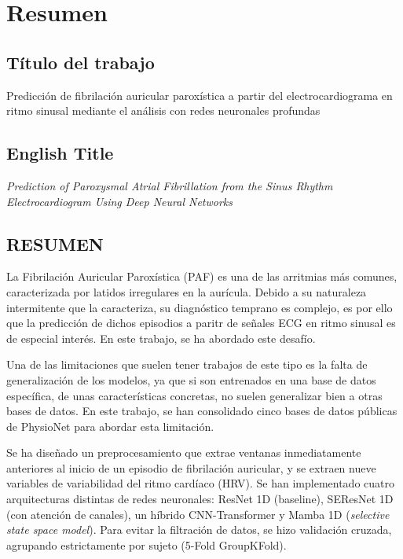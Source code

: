 
\chapter*{Resumen}

\section*{Título del trabajo}
Predicción de fibrilación auricular paroxística a partir del electrocardiograma en ritmo
sinusal mediante el análisis con redes neuronales profundas

\section*{English Title}
{\itshape Prediction of Paroxysmal Atrial Fibrillation from the Sinus Rhythm
Electrocardiogram Using Deep Neural Networks}

\section*{RESUMEN}

La Fibrilación Auricular Paroxística (PAF) es una de las arritmias más comunes, caracterizada por latidos irregulares en la aurícula.
Debido a su naturaleza intermitente que la caracteriza, su diagnóstico temprano es complejo, es por ello que la predicción de dichos 
episodios a paritr de señales ECG en ritmo sinusal es de especial interés. En este trabajo, se ha abordado este desafío.

Una de las limitaciones que suelen tener trabajos de este tipo es la falta de generalización de los modelos, ya que si son entrenados
en una base de datos específica, de unas características concretas, no suelen generalizar bien a otras bases de datos. 
En este trabajo, se han consolidado cinco bases de datos públicas de PhysioNet para abordar esta limitación. 

Se ha diseñado un preprocesamiento que extrae ventanas inmediatamente anteriores al inicio de un episodio de fibrilación auricular, 
y se extraen nueve variables de variabilidad del ritmo cardíaco (HRV). Se han implementado cuatro arquitecturas distintas de redes neuronales:
ResNet 1D (baseline), SEResNet 1D (con atención de canales), un híbrido CNN-Transformer y Mamba 1D
(\textit{selective state space model}). Para evitar la filtración de datos, se hizo validación cruzada, agrupando estrictamente por sujeto
(5-Fold GroupKFold).

